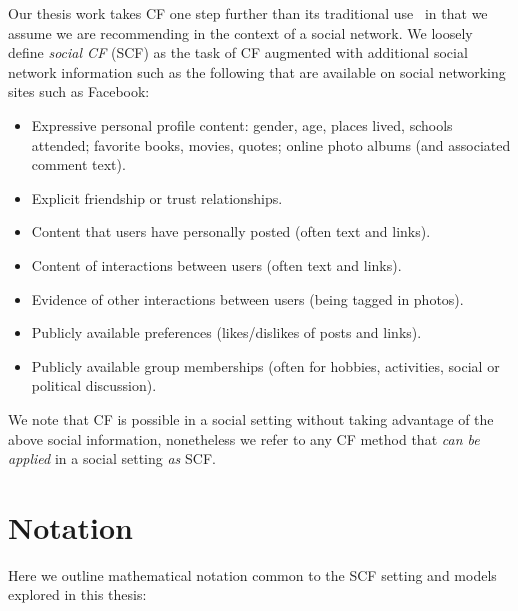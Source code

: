 Our thesis work takes CF one step further than its traditional 
use~\cite{collab_filtering} in that we assume we are
recommending in the context of a social network.  
We loosely define \emph{social CF} (SCF) as the task of CF augmented with
additional social network information such as the following that
are available on social networking sites such as Facebook:
\begin{itemize}
\item Expressive personal profile content: gender, age, places lived, schools
attended; favorite books, movies, quotes; online photo albums (and associated comment text).
\item Explicit friendship or trust relationships.
\item Content that users have personally posted (often text and links).
\item Content of interactions between users (often text and links).
\item Evidence of other interactions between users (being tagged in photos).
\item Publicly available preferences (likes/dislikes of posts and links).
\item Publicly available group memberships (often for hobbies, activities, social or political discussion).
\end{itemize}
We note that CF is possible in a social setting without taking advantage
of the above social information, nonetheless we refer to any CF method
that \emph{can be applied} in a social setting \emph{as} SCF.

\section{Notation}
\label{sec:notation}

Here we outline mathematical notation common to the SCF setting and
models explored in this thesis:

